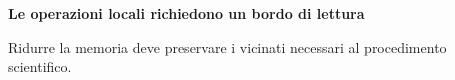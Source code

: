 \documentclass[12pt,aspectratio=1610]{beamer}
\begin{document}
\begin{frame}[plain]\hypertarget{slide105}{}
\begin{lrbox}{\TitleBox}
\begin{minipage}[t]{17.7cm}\raggedright\color{Ink}\fontsize{11.3}{14.8}\selectfont
\color{Navy}\bfseries\fontsize{20.6}{24.5}\selectfont Le operazioni locali richiedono un bordo di lettura
\end{minipage}\end{lrbox}

\begin{lrbox}{\RecallBox}
\begin{minipage}[t]{14.3cm}\raggedright\color{Ink}\fontsize{11.3}{14.8}\selectfont
\fontsize{10.3}{13.8}\selectfont Ridurre la memoria deve preservare i vicinati necessari al procedimento scientifico.
\end{minipage}\end{lrbox}


\end{frame}
\end{document}
